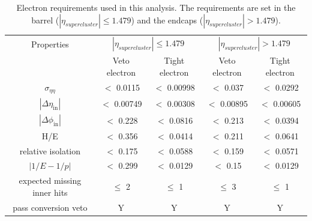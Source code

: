 \begin{table}[htbp]
	\centering
	
	\caption{Electron requirements used in this analysis. The requirements are set in the barrel ($|\eta_{supercluster}| \leq 1.479$)
		and the endcaps ($|\eta_{supercluster}| > 1.479$). }
	\begin{tabular}{ccccc}
		\toprule
		Properties & \multicolumn{2}{c}{$|\eta_{supercluster}| \leq 1.479$ } & \multicolumn{2}{c}{$|\eta_{supercluster}| > 1.479$ } \\
		
		& Veto electron & Tight electron & Veto electron & Tight electron \\ 
	  \midrule
		$ \sigma_{\eta \eta}$ & $<$ 0.0115 & $<$ 0.00998 & $<$ 0.037 & $<$ 0.0292 \\ 
	
		$|\Delta \eta_{\mathrm{in}}|$ & $<$ 0.00749 & $<$ 0.00308 & $<$ 0.00895& $<$ 0.00605\\ 
	 
		$|\Delta \phi_{\mathrm{in}}|$ & $<$ 0.228 & $<$ 0.0816 & $<$ 0.213& $<$ 0.0394 \\ 
		
		H/E & $<$ 0.356 & $<$ 0.0414 & $<$ 0.211& $<$ 0.0641 \\ 
		
		relative isolation & $<$ 0.175 & $<$ 0.0588  & $<$ 0.159& $<$ 0.0571\\ 
	
		$|1/E-1/p|$ & $<$ 0.299 \GeVinv& $<$ 0.0129 \GeVinv& $<$ 0.15 \GeVinv&$<$ 0.0129 \GeVinv\\ 
	
		expected missing inner hits & $\leq $ 2 & $\leq $ 1 &  $\leq $ 3 &  $\leq $ 1\\ 
		
		pass conversion veto & Y & Y & Y & Y\\ 
		\bottomrule
	\end{tabular} 
	\label{tab:ElecReq}
\end{table}


